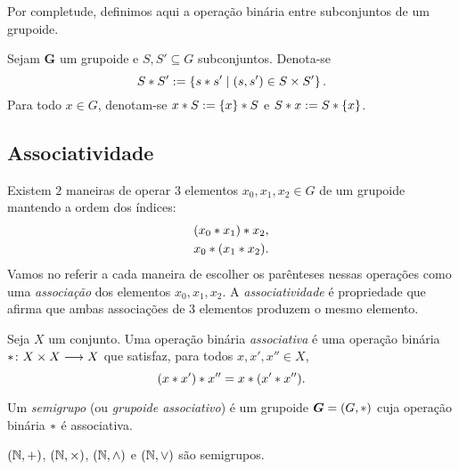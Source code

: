 Por completude, definimos aqui a operação binária entre subconjuntos de um grupoide.

\begin{definition}
Sejam $\bm G$ um grupoide e $S,S' \subseteq G$ subconjuntos. Denota-se
	\begin{equation*}
	S \ast S' := \left\{ s \ast s' \;\middle\vert\; (s,s') \in S \times S' \right\}.
	\end{equation*}
Para todo $x \in G$, denotam-se $x \ast S := \{x\} \ast S$ e $S \ast x := S \ast \{x\}$.
\end{definition}

\subsection{Associatividade}

Existem $2$ maneiras de operar $3$ elementos $x_0, x_1, x_2 \in G$ de um grupoide mantendo a ordem dos índices:
	\begin{align*}
	& (x_0 \ast x_1) \ast x_2, \\
	& x_0 \ast (x_1 \ast x_2).
	\end{align*}
Vamos no referir a cada maneira de escolher os parênteses nessas operações como uma \textit{associação} dos elementos $x_0, x_1, x_2$. A \textit{associatividade} é propriedade que afirma que ambas associações de $3$ elementos produzem o mesmo elemento.%

\begin{definition}[Associatividade]
\label{def:associatividade.operacao.binaria}
Seja $X$ um conjunto. Uma operação binária \emph{associativa} é uma operação binária $\ast\colon \allowbreak X \times X \longrightarrow X$ que satisfaz, para todos $x,x',x'' \in X$,
	\begin{equation*}
	(x \ast x') \ast x'' = x \ast (x' \ast x'').
	\end{equation*}
\end{definition}

\begin{definition}
Um \emph{semigrupo} (ou \emph{grupoide associativo}) é um grupoide $\bm G=(G,\ast)$ cuja operação binária $\ast$ é associativa.%
\end{definition}

\begin{example}
$(\mathbb{N},+)$, $(\mathbb{N},\times)$, $(\mathbb{N},\mathbin{\wedge})$ e $(\mathbb{N},\mathbin{\vee})$ são semigrupos.
\end{example}

